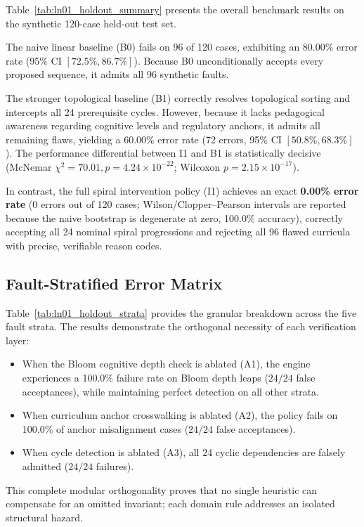 \documentclass[11pt,a4paper]{article}
\begin{document}
Table~\ref{tab:ln01_holdout_summary} presents the overall benchmark results on the synthetic 120-case held-out test set.



The naive linear baseline (B0) fails on 96 of 120 cases, exhibiting an 80.00\% error rate (95\% CI $[72.5\%, 86.7\%]$). Because B0 unconditionally accepts every proposed sequence, it admits all 96 synthetic faults. 

The stronger topological baseline (B1) correctly resolves topological sorting and intercepts all 24 prerequisite cycles. However, because it lacks pedagogical awareness regarding cognitive levels and regulatory anchors, it admits all remaining flaws, yielding a 60.00\% error rate (72 errors, 95\% CI $[50.8\%, 68.3\%]$). The performance differential between I1 and B1 is statistically decisive (McNemar $\chi^2 = 70.01, p = 4.24 \times 10^{-22}$; Wilcoxon $p = 2.15 \times 10^{-17}$).

In contrast, the full spiral intervention policy (I1) achieves an exact \textbf{0.00\% error rate} (0 errors out of 120 cases; Wilson/Clopper--Pearson intervals are reported because the naive bootstrap is degenerate at zero, 100.0\% accuracy), correctly accepting all 24 nominal spiral progressions and rejecting all 96 flawed curricula with precise, verifiable reason codes.

\subsection{Fault-Stratified Error Matrix}

Table~\ref{tab:ln01_holdout_strata} provides the granular breakdown across the five fault strata. The results demonstrate the orthogonal necessity of each verification layer:
\begin{itemize}
    \item When the Bloom cognitive depth check is ablated (A1), the engine experiences a 100.0\% failure rate on Bloom depth leaps ($24/24$ false acceptances), while maintaining perfect detection on all other strata.
    \item When curriculum anchor crosswalking is ablated (A2), the policy fails on 100.0\% of anchor misalignment cases ($24/24$ false acceptances).
    \item When cycle detection is ablated (A3), all 24 cyclic dependencies are falsely admitted ($24/24$ failures).
\end{itemize}
This complete modular orthogonality proves that no single heuristic can compensate for an omitted invariant; each domain rule addresses an isolated structural hazard.
\end{document}
